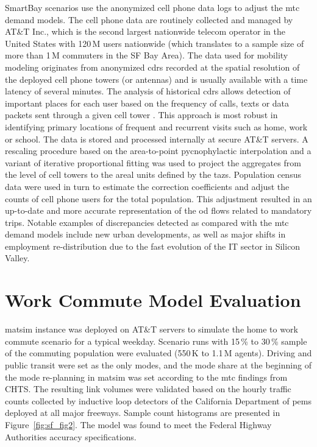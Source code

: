SmartBay scenarios use the anonymized cell phone data logs to adjust the \gls{mtc} demand models. The cell phone data are routinely collected and managed by AT\&T Inc., which is the second largest nationwide telecom operator in the United States with 120\,M users nationwide (which translates to a sample size of more than 1\,M commuters in the SF Bay Area). The data used for mobility modeling originates from anonymized \glspl{cdr} recorded at the spatial resolution of the deployed cell phone towers (or antennas) and is usually available with a time latency of several minutes. The analysis of historical \glspl{cdr} allows detection of important places for each user based on the frequency of calls, texts or data packets sent through a given cell tower \citep[][]{IsaacmanEtAl_LNCS_2011, BeckerEtAl_CACM_2013}. This approach is most robust in identifying primary locations of frequent and recurrent visits such as home, work or school. The data is stored and processed internally at secure AT\&T servers. A rescaling procedure based on the area-to-point pycnophylactic interpolation \citep[][]{KaiserEtAl_PMC_2013} and a variant of iterative proportional fitting was used to project the aggregates from the level of cell towers to the areal units defined by the \glspl{taz}. Population census data were used in turn to estimate the correction coefficients and adjust the counts of cell phone users for the total population. This adjustment resulted in an up-to-date and more accurate representation of the \gls{od} flows related to mandatory trips. Notable examples of discrepancies detected as compared with the \gls{mtc} demand models include new urban developments, as well as major shifts in employment re-distribution due to the fast evolution of the IT sector in Silicon Valley.

\section{Work Commute Model Evaluation}
\gls{matsim} instance was deployed on AT\&T servers to simulate the home to work commute scenario for a typical weekday. Scenario runs with 15\,\% to 30\,\% sample of the commuting population were evaluated (550\,K to 1.1\,M agents). Driving and public transit were set as the only modes, and the mode share at the beginning of the mode re-planning in \gls{matsim} was set according to the \gls{mtc} findings from CHTS. The resulting link volumes were validated based on the hourly traffic counts collected by inductive loop detectors of the California Department of \gls{pems} deployed at all major freeways. Sample count histograms are presented in Figure~\ref{fig:sf_fig2}. The model was found to meet the Federal Highway Authorities accuracy specifications.

